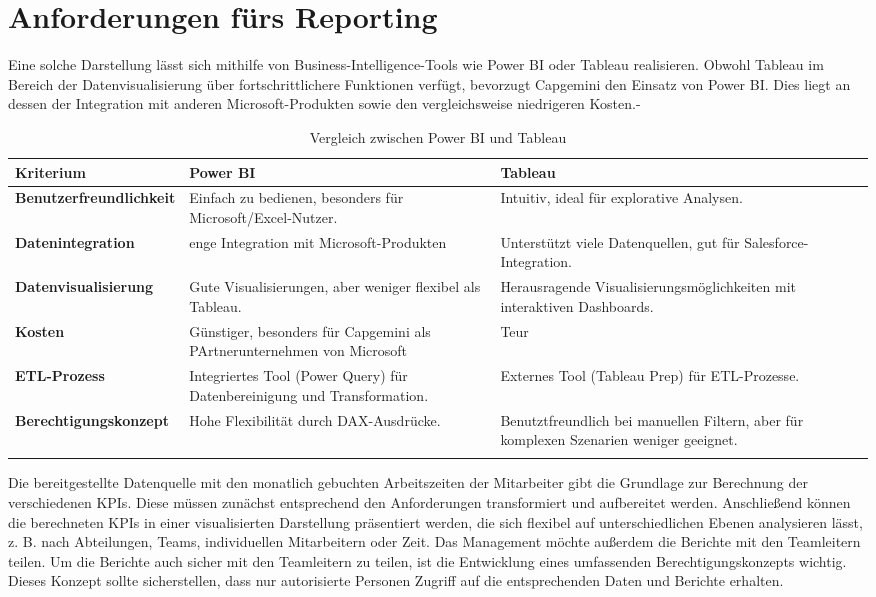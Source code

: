 \section{Anforderungen fürs Reporting}
Eine solche Darstellung lässt sich mithilfe von Business-Intelligence-Tools wie Power BI \cite{Power_BI} oder Tableau \cite{Tableua} realisieren. Obwohl Tableau im Bereich der Datenvisualisierung über fortschrittlichere Funktionen verfügt, bevorzugt Capgemini den Einsatz von Power BI. Dies liegt an dessen der Integration mit anderen Microsoft-Produkten sowie den vergleichsweise niedrigeren Kosten.-
\newline
\begin{longtable}{|p{4.5cm}|p{5.5cm}|p{5.5cm}|}
	\hline
	\textbf{Kriterium} & \textbf{Power BI} & \textbf{Tableau} \\ \hline
	\textbf{Benutzerfreundlichkeit} & Einfach zu bedienen, besonders für Microsoft/Excel-Nutzer. & Intuitiv, ideal für explorative Analysen. \\ \hline
	\textbf{Datenintegration} & enge Integration mit Microsoft-Produkten & Unterstützt viele Datenquellen, gut für Salesforce-Integration. \\ \hline
	\textbf{Datenvisualisierung} & Gute Visualisierungen, aber weniger flexibel als Tableau. & Herausragende Visualisierungsmöglichkeiten mit interaktiven Dashboards. \\ \hline
	\textbf{Kosten} & Günstiger, besonders für Capgemini als PArtnerunternehmen von Microsoft & Teur \\ \hline
	\textbf{ETL-Prozess} & Integriertes Tool (Power Query) für Datenbereinigung und Transformation. & Externes Tool (Tableau Prep) für ETL-Prozesse. \\ \hline
	\textbf{Berechtigungskonzept} & Hohe Flexibilität durch DAX-Ausdrücke. & Benutztfreundlich bei manuellen Filtern, aber für komplexen Szenarien weniger geeignet.\\ \hline
	\caption{Vergleich zwischen Power BI und Tableau}
\end{longtable}
Die bereitgestellte Datenquelle mit den monatlich gebuchten Arbeitszeiten der Mitarbeiter gibt die Grundlage zur Berechnung der verschiedenen KPIs. Diese müssen zunächst entsprechend den Anforderungen transformiert und aufbereitet werden. Anschließend können die berechneten KPIs in einer visualisierten Darstellung präsentiert werden, die sich flexibel auf unterschiedlichen Ebenen analysieren lässt, z. B. nach Abteilungen, Teams, individuellen Mitarbeitern oder Zeit.\newline
Das Management möchte außerdem die Berichte mit den Teamleitern teilen.
Um die Berichte auch sicher mit den Teamleitern zu teilen, ist die Entwicklung eines umfassenden Berechtigungskonzepts wichtig. Dieses Konzept sollte sicherstellen, dass nur autorisierte Personen Zugriff auf die entsprechenden Daten und Berichte erhalten.
